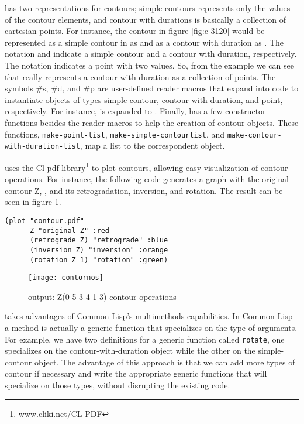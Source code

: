 \goiaba{} has two representations for contours; simple contours
represents only the values of the contour elements, and contour with
durations is basically a collection of cartesian points. For instance,
the contour in figure \ref{fig:c-3120} would be represented as a
simple contour in \goiaba{} as  and as a contour
with duration as . The
notation  and  indicate a simple
contour and a contour with duration, respectively. The notation
 indicates a point with two values. So, from the
example we can see that \goiaba{} really represents a contour with
duration as a collection of points. The symbols \#s, \#d, and \#p are
user-defined reader macros that expand into code to instantiate
objects of types simple-contour, contour-with-duration, and point,
respectively. For instance,  is expanded to
. Finally, \goiaba{} has a few
constructor functions besides the reader macros to help the creation
of contour objects. These functions, \texttt{make-point-list},
\texttt{make-sim\-ple-contour\-list}, and
\texttt{make-contour-with-dura\-tion-list}, map a list to the
correspondent object.

\goiaba{} uses the Cl-pdf library\footnote{\url{www.cliki.net/CL-PDF}}
to plot contours, allowing easy visualization of contour operations.
For instance, the following code generates a graph with the original
contour Z, , and its retrogradation, inversion,
and rotation. The result can be seen in figure \ref{fig:operacoes}.

\begin{verbatim}
(plot "contour.pdf"
      Z "original Z" :red
      (retrograde Z) "retrograde" :blue
      (inversion Z) "inversion" :orange
      (rotation Z 1) "rotation" :green)
\end{verbatim}

\begin{figure}
  \centering
  \texttt{[image: contornos]}
  \caption{\goiaba{} output: Z(0 5 3 4 1 3) contour operations}
  \label{fig:operacoes}
\end{figure}

\goiaba{} takes advantages of Common Lisp's multimethods capabilities.
In Common Lisp a method is actually a generic function that
specializes on the type of arguments. For example, we have two
definitions for a generic function called \texttt{rotate}, one
specializes on the contour-with-duration object while the other on the
simple-contour object. The advantage of this approach is that we can
add more types of contour if necessary and write the appropriate
generic functions that will specialize on those types, without
disrupting the existing code.

